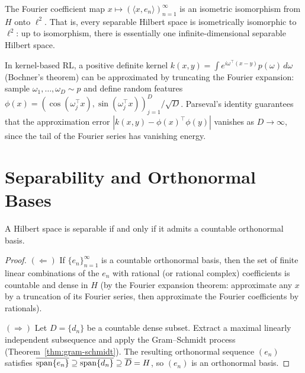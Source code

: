 \documentclass[11pt,a4paper]{article}
\begin{document}
\begin{keyresult}[title={Parseval's Identity -- Isometry of Coefficient Map}]
The Fourier coefficient map $x \mapsto (\langle x, e_n \rangle)_{n=1}^\infty$
is an isometric isomorphism from $H$ onto $\ell^2$. That is, every
separable Hilbert space is isometrically isomorphic to $\ell^2$: up to
isomorphism, there is essentially one infinite-dimensional separable
Hilbert space.
\end{keyresult}

\begin{rlconnection}[title={Fourier Features in RL Function Approximation}]
In kernel-based RL, a positive definite kernel
$k(x,y) = \int e^{i\omega^\top(x-y)} p(\omega)\, d\omega$ (Bochner's
theorem) can be approximated by truncating the Fourier expansion: sample
$\omega_1, \ldots, \omega_D \sim p$ and define random features
$\phi(x) = (\cos(\omega_j^\top x), \sin(\omega_j^\top x))_{j=1}^D / \sqrt{D}$.
Parseval's identity guarantees that the approximation error
$|k(x,y) - \phi(x)^\top \phi(y)|$ vanishes as $D \to \infty$, since
the tail of the Fourier series has vanishing energy.
\end{rlconnection}


\section{Separability and Orthonormal Bases}
\label{sec:separability}

\begin{proposition}
\label{prop:separability}
A Hilbert space is separable if and only if it admits a countable
orthonormal basis.
\end{proposition}

\begin{proof}
$(\Leftarrow)$ If $\{e_n\}_{n=1}^\infty$ is a countable orthonormal
basis, then the set of finite linear combinations of the $e_n$ with
rational (or rational complex) coefficients is countable and dense in
$H$ (by the Fourier expansion theorem: approximate any $x$ by a
truncation of its Fourier series, then approximate the Fourier
coefficients by rationals).

$(\Rightarrow)$ Let $D = \{d_n\}$ be a countable dense subset. Extract
a maximal linearly independent subsequence and apply the Gram--Schmidt
process (Theorem~\ref{thm:gram-schmidt}). The resulting orthonormal
sequence $(e_n)$ satisfies
$\overline{\operatorname{span}\{e_n\}} \supseteq \overline{\operatorname{span}\{d_n\}}
\supseteq \overline{D} = H$, so $(e_n)$ is an orthonormal basis.
\end{proof}
\end{document}
